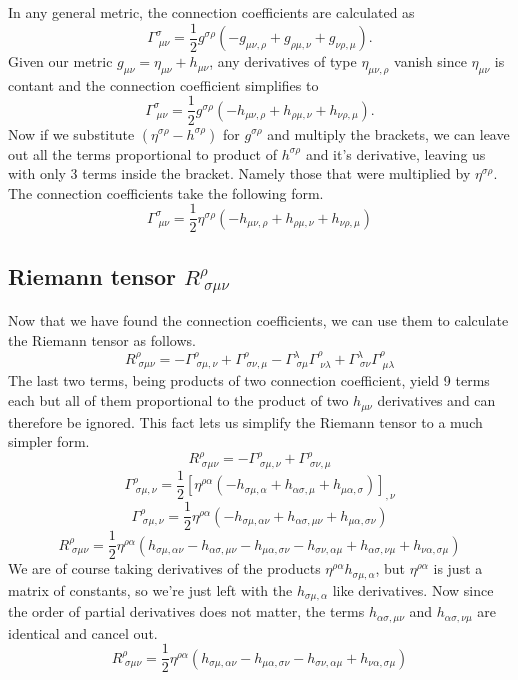In any general metric, the connection coefficients are calculated as
$$\Gamma^{\sigma}_{\;\mu\nu}=\frac{1}{2}g^{\sigma\rho}(-g_{\mu\nu,\rho}+g_{\rho\mu,\nu}+g_{\nu\rho,\mu}).$$
Given our metric $g_{\mu\nu} = \eta_{\mu\nu} + h_{\mu\nu}$, any derivatives of type $\eta_{\mu\nu,\rho}$ vanish since $\eta_{\mu\nu}$ is contant and the connection coefficient simplifies to
$$\Gamma^{\sigma}_{\;\mu\nu}=\frac{1}{2}g^{\sigma\rho}(-h_{\mu\nu,\rho}+h_{\rho\mu,\nu}+h_{\nu\rho,\mu}).$$
Now if we substitute $(\eta^{\sigma\rho} - h^{\sigma\rho})$ for $g^{\sigma\rho}$ and multiply the brackets, we can leave out all the terms proportional to product of $h^{\sigma\rho}$ and it's derivative, leaving us with only 3 terms inside the bracket. Namely those that were multiplied by $\eta^{\sigma\rho}$. The connection coefficients take the following form.
\begin{equation}\boxed{
    \Gamma^{\sigma}_{\;\mu\nu}=\frac{1}{2}\eta^{\sigma\rho}(-h_{\mu\nu,\rho}+h_{\rho\mu,\nu}+h_{\nu\rho,\mu})}
\end{equation}

\newpage
\subsection{Riemann tensor $R^\rho_{\;\sigma\mu\nu}$}

Now that we have found the connection coefficients, we can use them to calculate the Riemann tensor as follows.
$$R^\rho_{\;\sigma\mu\nu} = -\Gamma^\rho_{\;\sigma\mu,\nu}+\Gamma^\rho_{\;\sigma\nu,\mu}-\Gamma^\lambda_{\;\sigma\mu}\Gamma^\rho_{\;\nu\lambda}+\Gamma^\lambda_{\;\sigma\nu}\Gamma^\rho_{\;\mu\lambda}$$
The last two terms, being products of two connection coefficient, yield 9 terms each but all of them proportional to the product of two $h_{\mu\nu}$ derivatives and can therefore be ignored. This fact lets us simplify the Riemann tensor to a much simpler form.
$$R^\rho_{\;\sigma\mu\nu} = -\Gamma^\rho_{\;\sigma\mu,\nu}+\Gamma^\rho_{\;\sigma\nu,\mu}$$
$$\Gamma^\rho_{\;\sigma\mu,\nu} = \frac{1}{2}[\eta^{\rho\alpha}(-h_{\sigma\mu,\alpha}+h_{\alpha\sigma,\mu}+h_{\mu\alpha,\sigma})]_{,\nu}$$
$$\Gamma^\rho_{\;\sigma\mu,\nu} = \frac{1}{2}\eta^{\rho\alpha}(-h_{\sigma\mu,\alpha\nu}+h_{\alpha\sigma,\mu\nu}+h_{\mu\alpha,\sigma\nu})$$
$$R^\rho_{\;\sigma\mu\nu} = \frac{1}{2}\eta^{\rho\alpha}(h_{\sigma\mu,\alpha\nu}-h_{\alpha\sigma,\mu\nu}-h_{\mu\alpha,\sigma\nu}-h_{\sigma\nu,\alpha\mu}+h_{\alpha\sigma,\nu\mu}+h_{\nu\alpha,\sigma\mu})$$
We are of course taking derivatives of the products $\eta^{\rho\alpha}h_{\sigma\mu,\alpha}$, but $\eta^{\rho\alpha}$ is just a matrix of constants, so we're just left with the $h_{\sigma\mu,\alpha}$ like derivatives. Now since the order of partial derivatives does not matter, the terms $h_{\alpha\sigma,\mu\nu}$ and $h_{\alpha\sigma,\nu\mu}$ are identical and cancel out.
\begin{equation}
\boxed{R^\rho_{\;\sigma\mu\nu} = \frac{1}{2}\eta^{\rho\alpha}(h_{\sigma\mu,\alpha\nu}-h_{\mu\alpha,\sigma\nu}-h_{\sigma\nu,\alpha\mu}+h_{\nu\alpha,\sigma\mu})}
\end{equation}

